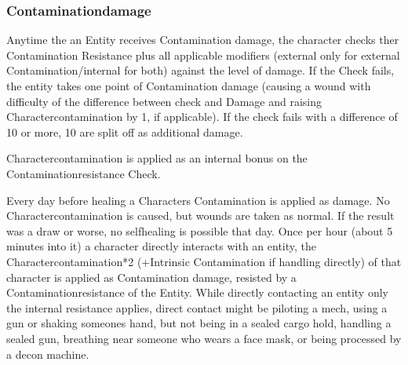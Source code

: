     \subsubsection{Contaminationdamage}
    Anytime the an Entity receives Contamination damage, the character checks ther Contamination
    Resistance plus all applicable modifiers (external only for external Contamination/internal for both) against the
    level of damage.
    If the Check fails, the entity takes one point of Contamination damage (causing a wound with
    difficulty of the difference between check and Damage and raising Charactercontamination by 1, if applicable).
    If the check fails with a difference of 10 or more, 10 are split off as additional damage. \par
    Charactercontamination is applied as an internal bonus on the Contaminationresistance Check. \par
    Every day before healing a Characters Contamination is applied as damage.
    No Charactercontamination is caused,
    but wounds are taken as normal.
    If the result was a draw or worse, no selfhealing is possible that day.
    Once per hour (about 5 minutes into it) a character directly interacts with an entity, the Charactercontamination*2
    (+Intrinsic Contamination if handling directly) of that character is applied as Contamination damage,
    resisted by a Contaminationresistance of the Entity.
    While directly contacting an entity only the internal
    resistance applies, direct contact might be piloting a mech, using a gun or shaking someones hand, but not being in
    a sealed cargo hold, handling a sealed gun, breathing near someone who wears a face mask, or being processed
    by a decon machine.
